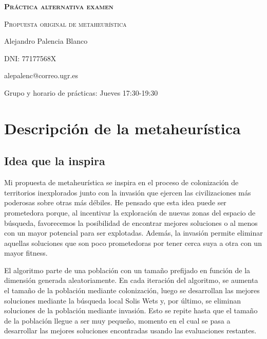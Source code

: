 \documentclass[10pt,a4paper]{article}
\begin{document}
\begin{titlepage}
	\centering
	{\bfseries\scshape\Huge Práctica alternativa examen \par}
	\vspace{3cm}
	{\scshape\Huge Propuesta original de metaheurística \par}
	\vfill
	{\Large Alejandro Palencia Blanco \par}
	\vspace{1cm}
	{\Large DNI: 77177568X \par}
	\vspace{1cm}
	{\Large alepalenc@correo.ugr.es \par}
	\vspace{1cm}
	\vfill
	{\Large Grupo y horario de prácticas: Jueves 17:30-19:30 \par}
\end{titlepage}

\newpage

\tableofcontents

\newpage

\section{Descripción de la metaheurística}

\subsection{Idea que la inspira}

Mi propuesta de metaheurística se inspira en el proceso de colonización de territorios inexplorados junto con la invasión que ejercen las civilizaciones más poderosas sobre otras más débiles. He pensado que esta idea puede ser prometedora porque, al incentivar la exploración de nuevas zonas del espacio de búsqueda, favorecemos la posibilidad de encontrar mejores soluciones o al menos con un mayor potencial para ser explotadas. Además, la invasión permite eliminar aquellas soluciones que son poco prometedoras por tener cerca suya a otra con un mayor fitness.

El algoritmo parte de una población con un tamaño prefijado en función de la dimensión generada aleatoriamente. En cada iteración del algoritmo, se aumenta el tamaño de la población mediante colonización, luego se desarrollan las mejores soluciones mediante la búsqueda local Solis Wets y, por último, se eliminan soluciones de la población mediante invasión. Esto se repite hasta que el tamaño de la población llegue a ser muy pequeño, momento en el cual se pasa a desarrollar las mejores soluciones encontradas usando las evaluaciones restantes.
\end{document}
